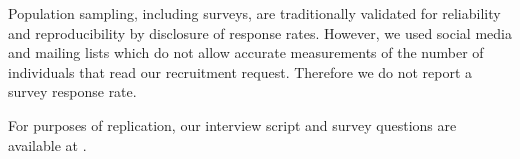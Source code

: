 Population sampling, including surveys, are traditionally validated for reliability and reproducibility by disclosure of response rates.
However, we used social media and mailing lists which do not allow accurate measurements of the number of individuals that read our recruitment request.
Therefore we do not report a survey response rate.

For purposes of replication, our interview script and survey questions are available at \cite{companion_site}. 

